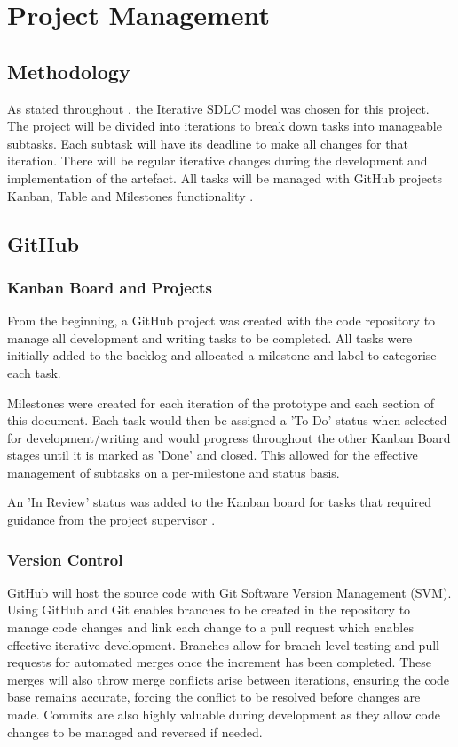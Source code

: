 \chapter{Project Management}
\label{chap:pm}

\section{Methodology}

As stated throughout , the Iterative SDLC model was chosen for this project. The project will be divided into iterations to break down tasks into manageable subtasks. Each subtask will have its deadline to make all changes for that iteration. There will be regular iterative changes during the development and implementation of the artefact. All tasks will be managed with GitHub projects Kanban, Table and Milestones functionality .

\section{GitHub}

\subsection{Kanban Board and Projects}
\label{pm:kanban}

From the beginning, a GitHub project was created with the code repository to manage all development and writing tasks to be completed. All tasks were initially added to the backlog and allocated a milestone and label to categorise each task.

Milestones were created for each iteration of the prototype and each section of this document. Each task would then be assigned a 'To Do' status when selected for development/writing and would progress throughout the other Kanban Board stages until it is marked as 'Done' and closed. This allowed for the effective management of subtasks on a per-milestone and status basis.

An 'In Review' status was added to the Kanban board for tasks that required guidance from the project supervisor .

\subsection{Version Control}
\label{pm:version_control}

GitHub will host the source code with Git Software Version Management (SVM). Using GitHub and Git enables branches to be created in the repository to manage code changes and link each change to a pull request which enables effective iterative development. Branches allow for branch-level testing and pull requests for automated merges once the increment has been completed. These merges will also throw merge conflicts arise between iterations, ensuring the code base remains accurate, forcing the conflict to be resolved before changes are made. Commits are also highly valuable during development as they allow code changes to be managed and reversed if needed. 

